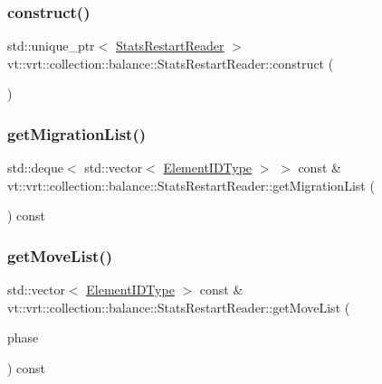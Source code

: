 \subsubsection{\texorpdfstring{construct()}{construct()}}
{\footnotesize\ttfamily std\+::unique\+\_\+ptr$<$ \hyperlink{structvt_1_1vrt_1_1collection_1_1balance_1_1_stats_restart_reader}{Stats\+Restart\+Reader} $>$ vt\+::vrt\+::collection\+::balance\+::\+Stats\+Restart\+Reader\+::construct (\begin{DoxyParamCaption}{ }\end{DoxyParamCaption})\hspace{0.3cm}{\ttfamily [static]}}

\mbox{\label{structvt_1_1vrt_1_1collection_1_1balance_1_1_stats_restart_reader_a87fa9ef4ba869acb1af6bf5066027029}} 
\subsubsection{\texorpdfstring{get\+Migration\+List()}{getMigrationList()}}
{\footnotesize\ttfamily std\+::deque$<$ std\+::vector$<$ \hyperlink{namespacevt_1_1vrt_1_1collection_1_1balance_a14c8d2c972f2913aa3f1636e5be0a120}{Element\+I\+D\+Type} $>$ $>$ const  \& vt\+::vrt\+::collection\+::balance\+::\+Stats\+Restart\+Reader\+::get\+Migration\+List (\begin{DoxyParamCaption}{ }\end{DoxyParamCaption}) const}

\mbox{\label{structvt_1_1vrt_1_1collection_1_1balance_1_1_stats_restart_reader_aa2fcd261c5a729969bb5cafa4b628bdc}} 
\subsubsection{\texorpdfstring{get\+Move\+List()}{getMoveList()}}
{\footnotesize\ttfamily std\+::vector$<$ \hyperlink{namespacevt_1_1vrt_1_1collection_1_1balance_a14c8d2c972f2913aa3f1636e5be0a120}{Element\+I\+D\+Type} $>$ const  \& vt\+::vrt\+::collection\+::balance\+::\+Stats\+Restart\+Reader\+::get\+Move\+List (\begin{DoxyParamCaption}\item[{\hyperlink{namespacevt_a46ce6733d5cdbd735d561b7b4029f6d7}{Phase\+Type}}]{phase }\end{DoxyParamCaption}) const}

